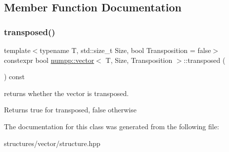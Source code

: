 \subsection{Member Function Documentation}
\mbox{\label{classnumpp_1_1vector_a81037f5cce7bd02354efe8b967c191bf}} 
\subsubsection{\texorpdfstring{transposed()}{transposed()}}
{\footnotesize\ttfamily template$<$typename T, std\+::size\+\_\+t Size, bool Transposition = false$>$ \\
constexpr bool \hyperlink{classnumpp_1_1vector}{numpp\+::vector}$<$ T, Size, Transposition $>$\+::transposed (\begin{DoxyParamCaption}{ }\end{DoxyParamCaption}) const\hspace{0.3cm}{\ttfamily [inline]}}

returns whether the vector is transposed. \begin{DoxyReturn}{Returns}
true for transposed, false otherwise
\end{DoxyReturn}


The documentation for this class was generated from the following file\+:\begin{DoxyCompactItemize}
\item 
structures/vector/structure.\+hpp\end{DoxyCompactItemize}
